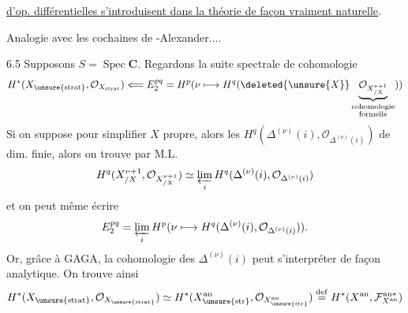 \uline{d'op. différentielles s'introduisent dans la théorie de façon vraiment naturelle}.

Analogie avec les cochaines de -Alexander....

6.5 Supposons $S=\operatorname{Spec}\mathbf C$. Regardons la suite spectrale de cohomologie 
\[
H^*(X_{\unsure{\mathrm{strat}}},\mathcal O_{X_{\mathrm{strat}}})\Longleftarrow E_2^{pq}
=H^p(\nu\longmapsto H^q(\deleted{\unsure{X}}\underbrace{\mathcal O_{X^{\nu+1}_{/X}}}_{\substack{\text{cohomologie}\\\text{formelle}}}))
\]
Si on suppose pour simplifier $X$ propre, alors les $H^q(\Delta^{(\nu)}(i),\mathcal O_{\Delta^{(\nu)}(i)})$ de dim. finie, alors on trouve par M.L.
\[
H^q(X^{\nu+1}_{/X},\mathcal O_{X^{\nu+1}_{/X}})\simeq\varprojlim_i H^q(\Delta^{(\nu)}(i),\mathcal O_{\Delta^{(\nu)}(i)})
\]
et on peut même écrire
\[
E_2^{pq}=\varprojlim_i H^p(\nu\longmapsto H^q(\Delta^{(\nu)}(i),\mathcal O_{\Delta^{(\nu)}(i)})).
\]
Or, grâce à GAGA, la cohomologie des $\Delta^{(\nu)}(i)$ peut s'interpréter de façon analytique. On trouve ainsi
\[
H^*(X_{\unsure{\mathrm{strat}}},\mathcal O_{X_{\unsure{\mathrm{strat}}}})
\simeq H^*(X^{\mathrm{an}}_{\unsure{\mathrm{str}}},\mathcal O_{X^{\mathrm{an}}_{\unsure{\mathrm{str}}}})
\overset{\mathrm{def}}{=}H^*(X^{\mathrm{an}},\mathcal F_{X^{\mathrm{an}}}^{\mathrm{an}*})
\]

